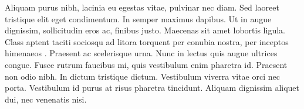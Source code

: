 \label{sec:results}
Aliquam purus nibh, lacinia eu egestas vitae, pulvinar nec diam. Sed laoreet tristique elit eget condimentum. In semper maximus dapibus. Ut in augue dignissim, sollicitudin eros ac, finibus justo. Maecenas sit amet lobortis ligula. Class aptent taciti sociosqu ad litora torquent per conubia nostra, per inceptos himenaeos \cite{Darwin1872}. Praesent ac scelerisque urna. Nunc in lectus quis augue ultrices congue. Fusce rutrum faucibus mi, quis vestibulum enim pharetra id. Praesent non odio nibh. In dictum tristique dictum. Vestibulum viverra vitae orci nec porta. Vestibulum id purus at risus pharetra tincidunt. Aliquam dignissim aliquet dui, nec venenatis nisi.